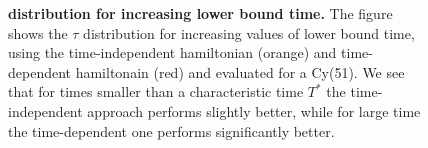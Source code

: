 \begin{figure}[ht]
  \centering
  \caption[$\tau$ distribution for increasing lower bound time.]{\textbf{\bm{$\tau$} distribution for increasing lower bound time. }The figure shows the $\tau$ distribution for increasing values of lower bound time, using the time-independent hamiltonian (orange) and time-dependent hamiltonain (red) and evaluated for a Cy(51). We see that for times smaller than a characteristic time $T^*$ the time-independent approach performs slightly better, while for large time the time-dependent one performs significantly better.}
  \label{fig:tau_increasing_time}
\end{figure}
